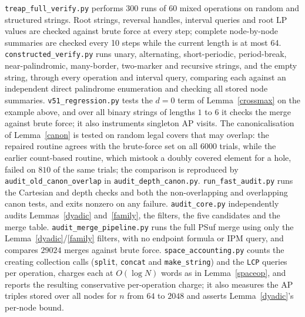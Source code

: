 ﻿\documentclass[11pt]{article}
\theoremstyle{plain}
\theoremstyle{remark}
\begin{document}
\texttt{treap\_full\_verify.py} performs 300 runs of 60 mixed operations on random and structured strings. Root strings, reversal handles, interval queries and root LP values are checked against brute force at every step; complete node-by-node summaries are checked every 10 steps while the current length is at most 64. \texttt{constructed\_verify.py} runs unary, alternating, short-periodic, period-break, near-palindromic, many-border, two-marker and recursive strings, and the empty string, through every operation and interval query, comparing each against an independent direct palindrome enumeration and checking all stored node summaries. \texttt{v51\_regression.py} tests the $d=0$ term of Lemma~\ref{crossmax} on the example above, and over all binary strings of lengths $1$ to $6$ it checks the merge against brute force; it also instruments singleton AP visits. The canonicalisation of Lemma~\ref{canon} is tested on random legal covers that may overlap: the repaired routine agrees with the brute-force set on all $6000$ trials, while the earlier count-based routine, which mistook a doubly covered element for a hole, failed on $810$ of the same trials; the comparison is reproduced by \texttt{audit\_old\_canon\_overlap} in \texttt{audit\_depth\_canon.py}. \texttt{run\_fast\_audit.py} runs the Cartesian and depth checks and both the non-overlapping and overlapping canon tests, and exits nonzero on any failure. \texttt{audit\_core.py} independently audits Lemmas~\ref{dyadic} and~\ref{family}, the filters, the five candidates and the merge table. \texttt{audit\_merge\_pipeline.py} runs the full PSuf merge using only the Lemma~\ref{dyadic}/\ref{family} filters, with no endpoint formula or IPM query, and compares $29024$ merges against brute force. \texttt{space\_accounting.py} counts the creating collection calls (\texttt{split}, \texttt{concat} and \texttt{make\_string}) and the \texttt{LCP} queries per operation, charges each at $O(\log N)$ words as in Lemma~\ref{spaceop}, and reports the resulting conservative per-operation charge; it also measures the AP triples stored over all nodes for $n$ from $64$ to $2048$ and asserts Lemma~\ref{dyadic}'s per-node bound.
\end{document}
